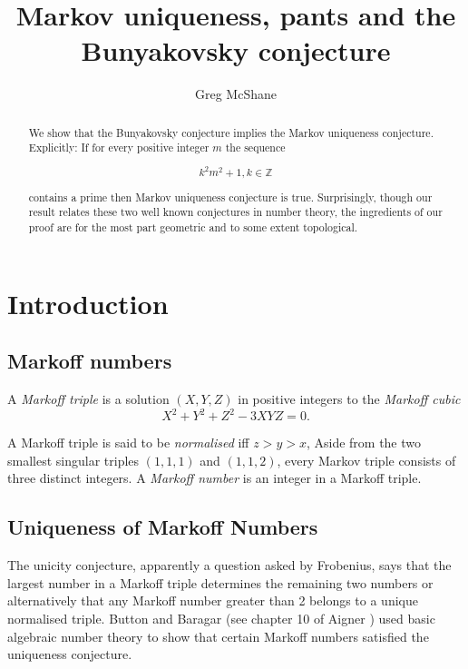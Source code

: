 \documentclass[12pt,a4paper]{amsart}
\title{Markov uniqueness, pants and the Bunyakovsky conjecture}
\author[McShane]{Greg McShane}
\def\ZZ{\mathbb{Z}}
\begin{document}
\maketitle

\begin{abstract} 

We show that the Bunyakovsky conjecture implies the Markov uniqueness
conjecture. Explicitly: If for every positive integer $m$ the sequence 

$$k^2m^2 + 1, k \in \ZZ$$ 

contains a prime then Markov uniqueness conjecture is true. Surprisingly,
though our result relates these two well known conjectures in number theory, 
the ingredients of   our proof are for the most part geometric and to some extent
topological.

\end{abstract} 


\section{Introduction}

\subsection{Markoff numbers}

A \textit{Markoff triple} is a  solution $(X,Y,Z)$  in positive integers to
the \textit{Markoff cubic}
\begin{equation}\label{m cubic}
X^2 + Y^2 + Z^2 - 3XYZ = 0.
\end{equation}

A Markoff triple is said to be \textit{normalised} iff $z> y > x$, Aside from
the two smallest singular triples $(1,1,1)$ and $(1,1,2)$, every Markov triple
consists of three distinct integers. A \textit{Markoff number} is an integer in
a Markoff triple.

\subsection{Uniqueness of Markoff Numbers}
 
The unicity conjecture, apparently a question asked by Frobenius, says that the
largest number in a Markoff triple determines the remaining two numbers or
alternatively that any Markoff number greater than 2 belongs to a unique
normalised triple. Button and Baragar (see chapter 10 of Aigner \cite{aigner})
used  basic algebraic number theory to show that certain Markoff numbers
satisfied the uniqueness conjecture.  
\end{document}
